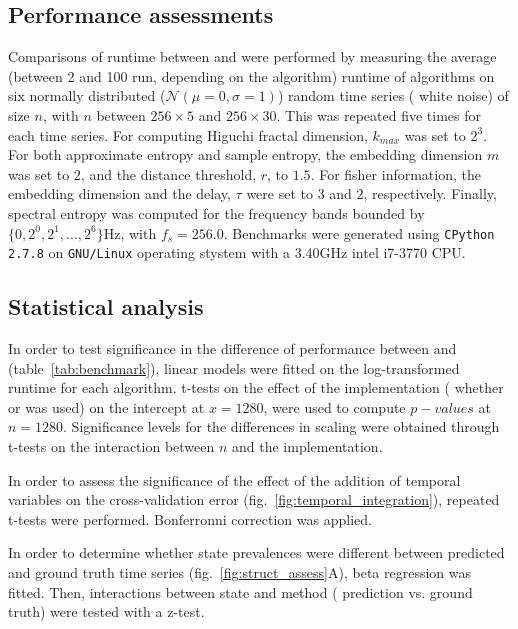 \subsection{Performance assessments}
Comparisons of runtime between \pr{} and \pyeeg{}\cite{bao_pyeeg:_2011} were performed by
measuring the average (between 2 and 100 run, depending on the algorithm) runtime of algorithms on six normally distributed ($\mathcal{N}(\mu=0,\sigma=1)$) random time series (\ie{} white noise) of size $n$,
with $n$ between $256 \times{} 5$ and $256 \times{} 30$.
This was repeated five times for each time series.
For computing  Higuchi fractal dimension\cite{higuchi_approach_1988}, $k_{max}$
was set to $2^3$.
For both approximate entropy and sample
entropy\cite{richman_physiological_2000}, the embedding dimension $m$ was set to $2$, and the distance threshold, $r$, to $1.5$.
For fisher information, the embedding dimension and the delay, $\tau$ were set to $3$ and $2$, respectively.
Finally, spectral entropy was computed for the frequency bands bounded by $\{0, 2^0, 2^1, ..., 2^6\}$Hz, with $f_s = 256.0$.
Benchmarks were generated using \texttt{CPython 2.7.8} on \texttt{GNU/Linux} operating stystem with a 3.40GHz intel i7-3770 CPU.

\subsection{Statistical analysis}
In order to test significance in the difference of performance between \pr{} and \pyeeg{} (table~\ref{tab:benchmark}),
linear models were fitted on the log-transformed runtime for each algorithm. 
t-tests on the effect of the implementation (\ie{} whether \pr{} or \pyeeg{} was used) on the intercept at $x=1280$, were used to compute $p-values$ at $n=1280$.
Significance levels for the differences in scaling were obtained through t-tests on the interaction between $n$ and the implementation.


In order to assess the significance of the effect of the addition of temporal variables on the cross-validation
error (fig.~\ref{fig:temporal_integration}), repeated t-tests were performed.
Bonferronni correction was applied.

In order to determine whether state prevalences were different between predicted and ground truth time series (fig.~\ref{fig:struct_assess}A),
beta regression \cite{cribari-neto_beta_2009} was fitted. 
Then, interactions between state and method (\ie{} prediction vs. ground truth) were tested with a z-test.

